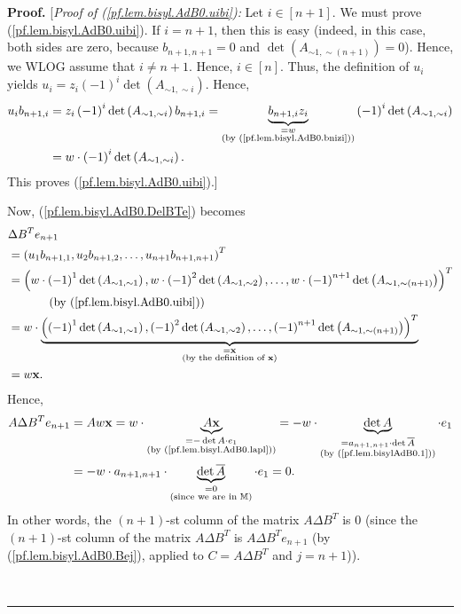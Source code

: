 \documentclass[numbers=enddot,12pt,final,onecolumn,notitlepage]{scrartcl}%
\theoremstyle{definition}
\newenvironment{proof}[1][Proof]{\noindent\textbf{#1.} }{\ \rule{0.5em}{0.5em}}
\newenvironment{verlong}{}{}
\begin{document}
\begin{proof}
\begin{verlong}
[\textit{Proof of (\ref{pf.lem.bisyl.AdB0.uibi}):} Let $i\in\left[
n+1\right]  $. We must prove (\ref{pf.lem.bisyl.AdB0.uibi}). If $i=n+1$, then
this is easy (indeed, in this case, both sides are zero, because
$b_{n+1,n+1}=0$ and $\det\left(  A_{\sim1,\sim\left(  n+1\right)  }\right)
=0$). Hence, we WLOG assume that $i\neq n+1$. Hence, $i\in\left[  n\right]  $.
Thus, the definition of $u_{i}$ yields $u_{i}=z_{i}\left(  -1\right)  ^{i}%
\det\left(  A_{\sim1,\sim i}\right)  $. Hence,%
\begin{align*}
u_{i}b_{n+1,i}  &  =z_{i}\left(  -1\right)  ^{i}\det\left(  A_{\sim1,\sim
i}\right)  b_{n+1,i}=\underbrace{b_{n+1,i}z_{i}}_{\substack{=w\\\text{(by
(\ref{pf.lem.bisyl.AdB0.bnizi}))}}}\left(  -1\right)  ^{i}\det\left(
A_{\sim1,\sim i}\right) \\
&  =w\cdot\left(  -1\right)  ^{i}\det\left(  A_{\sim1,\sim i}\right)  .
\end{align*}
This proves (\ref{pf.lem.bisyl.AdB0.uibi}).]
\end{verlong}

Now, (\ref{pf.lem.bisyl.AdB0.DelBTe}) becomes%
\begin{align*}
&  \Delta B^{T}e_{n+1}\\
&  =\left(  u_{1}b_{n+1,1},u_{2}b_{n+1,2},\ldots,u_{n+1}b_{n+1,n+1}\right)
^{T}\\
&  =\left(  w\cdot\left(  -1\right)  ^{1}\det\left(  A_{\sim1,\sim1}\right)
,w\cdot\left(  -1\right)  ^{2}\det\left(  A_{\sim1,\sim2}\right)
,\ldots,w\cdot\left(  -1\right)  ^{n+1}\det\left(  A_{\sim1,\sim\left(
n+1\right)  }\right)  \right)  ^{T}\\
&  \ \ \ \ \ \ \ \ \ \ \left(  \text{by (\ref{pf.lem.bisyl.AdB0.uibi})}\right)
\\
&  =w\cdot\underbrace{\left(  \left(  -1\right)  ^{1}\det\left(  A_{\sim
1,\sim1}\right)  ,\left(  -1\right)  ^{2}\det\left(  A_{\sim1,\sim2}\right)
,\ldots,\left(  -1\right)  ^{n+1}\det\left(  A_{\sim1,\sim\left(  n+1\right)
}\right)  \right)  ^{T}}_{\substack{=\mathbf{x}\\\text{(by the definition of
}\mathbf{x}\text{)}}}\\
&  =w\mathbf{x}.
\end{align*}
Hence,%
\begin{align*}
A\Delta B^{T}e_{n+1}  &  =Aw\mathbf{x}=w\cdot\underbrace{A\mathbf{x}%
}_{\substack{=-\det A\cdot e_{1}\\\text{(by (\ref{pf.lem.bisyl.AdB0.lapl}))}%
}}=-w\cdot\underbrace{\det A}_{\substack{=a_{n+1,n+1}\cdot\det\overline
{A}\\\text{(by (\ref{pf.lem.bisylAdB0.1}))}}}\cdot e_{1}\\
&  =-w\cdot a_{n+1,n+1}\cdot\underbrace{\det\overline{A}}%
_{\substack{=0\\\text{(since we are in }\mathbb{M}\text{)}}}\cdot e_{1}=0.
\end{align*}
In other words, the $\left(  n+1\right)  $-st column of the matrix $A\Delta
B^{T}$ is $0$ (since the $\left(  n+1\right)  $-st column of the matrix
$A\Delta B^{T}$ is $A\Delta B^{T}e_{n+1}$ (by (\ref{pf.lem.bisyl.AdB0.Bej}),
applied to $C=A\Delta B^{T}$ and $j=n+1$)).


\end{proof}
\end{document}
